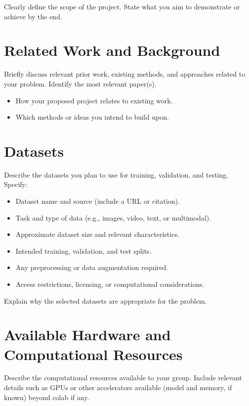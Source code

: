 \documentclass[11pt]{article}
\begin{document}
Clearly define the scope of the project. State what you aim to
demonstrate or achieve by the end.

\section{Related Work and Background}

Briefly discuss relevant prior work, existing methods, and
approaches related to your problem. Identify the most relevant paper(s).

\begin{itemize}[noitemsep]
    \item How your proposed project relates to existing work.
    \item Which methods or ideas you intend to build upon.
\end{itemize}

\section{Datasets}

Describe the datasets you plan to use for training, validation,
and testing. Specify:
\begin{itemize}[noitemsep]
    \item Dataset name and source (include a URL or citation).
    \item Task and type of data (e.g., images, video, text, or multimodal).
    \item Approximate dataset size and relevant characteristics.
    \item Intended training, validation, and test splits.
    \item Any preprocessing or data augmentation required.
    \item Access restrictions, licensing, or computational considerations.
\end{itemize}

Explain why the selected datasets are appropriate for the problem.

\section{Available Hardware and Computational Resources}

Describe the computational resources available to your group. Include relevant details such as GPUs or other accelerators available (model and memory, if known) beyond colab if any.
\end{document}
